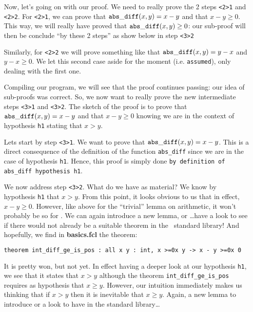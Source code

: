 \documentclass[11pt,a4paper,twoside,onecolumn,fullpage]{article}
\begin{document}
\medskip
Now, let's going on with our proof. We need to really prove the 2
steps \lstinline"<2>1" and \lstinline"<2>2". For \lstinline"<2>1", we
can prove that ${\tt abs\_diff} (x, y) = x - y$ and that
$x - y \ge 0$. This way, we will really have proved that
${\tt abs\_diff} (x, y) \ge 0$: our sub-proof will then be conclude ``by
these 2 steps'' as show below in step \lstinline"<3>2"

Similarly, for \lstinline"<2>2" we will prove something like that
${\tt abs\_diff} (x, y) = y - x$ and $y - x \ge 0$. We let this second case
aside for the moment (i.e. \lstinline"assumed"), only dealing with the
first one.

{\scriptsize
}

Compiling our program, we will see that the proof continues passing:
our idea of sub-proofs was correct. So, we now want to really prove
the new intermediate steps \lstinline"<3>1" and \lstinline"<3>2". The
sketch of the proof is to prove that ${\tt abs\_diff} (x, y) = x - y$ and
that $x - y \ge 0$ knowing we are in the context of hypothesis
\lstinline"h1" stating that $x > y$.

Lets start by step \lstinline"<3>1". We want to prove that
${\tt abs\_diff} (x, y) = x - y$.
This is a direct consequence of the definition of the function
\lstinline"abs_diff" since we are in the case of hypothesis
\lstinline"h1". Hence, this proof is simply done
\lstinline"by definition of abs_diff hypothesis h1".

We now address step \lstinline"<3>2".  What do we have as material? We
know by hypothesis \lstinline"h1" that $x>y$. From this point, it looks
obvious to us that in effect,  $x - y \ge 0$. However, like above for
the ``trivial'' lemma on arithmetic, it won't probably be so for
\zenon. We can again introduce a new lemma, or \ldots have a look to
see if there would not already be a suitable theorem in the \focal\
standard library! And hopefully, we find in \textbf{basics.fcl} the
theorem:

{\scriptsize
\begin{lstlisting}
theorem int_diff_ge_is_pos : all x y : int, x >=0x y -> x - y >=0x 0
\end{lstlisting}}

It is pretty won, but not yet. In effect having a deeper look at our
hypothesis \lstinline"h1", we see that it states that $x > y$ although
the theorem \lstinline"int_diff_ge_is_pos" requires as hypothesis that
$x \ge y$. However, our intuition immediately makes us thinking that if
$x > y$ then it is inevitable that $x \ge y$. Again, a new lemma to
introduce or a look to have in the standard library\ldots
\end{document}
